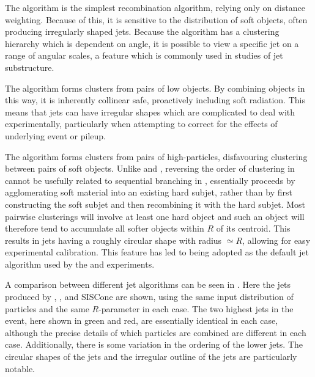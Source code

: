 The \CA algorithm is the simplest recombination algorithm, relying only on distance weighting.
Because of this, it is sensitive to the distribution of soft objects, often producing irregularly shaped jets.
Because the \CA algorithm has a clustering hierarchy which is dependent on angle, it is possible to view a specific jet on a range of angular scales, a feature which is commonly used in studies of jet substructure.

The \kt algorithm forms clusters from pairs of low \pT objects.
By combining objects in this way, it is inherently collinear safe, proactively including soft \QCD radiation. This means that \kt jets can have irregular shapes which are complicated to deal with experimentally, particularly when attempting to correct for the effects of underlying event or pileup.

The \akt algorithm forms clusters from pairs of high-\pT particles, disfavouring clustering between pairs of soft objects.
Unlike \kt and \CA, reversing the order of clustering in \akt cannot be usefully related to sequential branching in \QCD, essentially \akt proceeds by agglomerating soft material into an existing hard subjet, rather than by first constructing the soft subjet and then recombining it with the hard subjet.
Most pairwise clusterings will involve at least one hard object and such an object will therefore tend to accumulate all softer objects within $R$ of its centroid.
This results in \akt jets having a roughly circular shape with radius $\simeq R$, allowing for easy experimental calibration.
This feature has led to \akt being adopted as the default jet algorithm used by the \ATLAS and \CMS experiments.

A comparison between different jet algorithms can be seen in .
Here the jets produced by \kt, \CA, \akt and SISCone are shown, using the same input distribution of particles and the same $R$-parameter in each case.
The two highest \pT jets in the event, here shown in green and red, are essentially identical in each case, although the precise details of which particles are combined are different in each case.
Additionally, there is some variation in the ordering of the lower \pT jets.
The circular shapes of the \akt jets and the irregular outline of the \kt jets are particularly notable.

